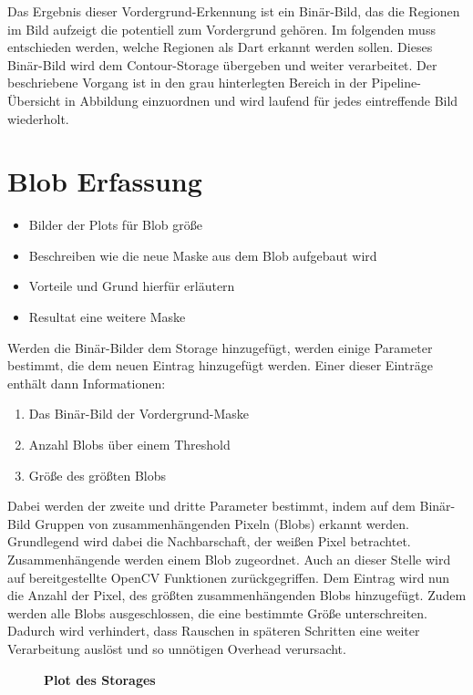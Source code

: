 Das Ergebnis dieser Vordergrund-Erkennung ist ein Binär-Bild, das die Regionen im Bild aufzeigt die potentiell zum Vordergrund gehören. Im folgenden muss entschieden werden, welche Regionen als Dart erkannt werden sollen. Dieses Binär-Bild wird dem Contour-Storage übergeben und weiter verarbeitet. Der beschriebene Vorgang ist in den grau hinterlegten Bereich in der Pipeline-Übersicht in Abbildung einzuordnen und wird laufend für jedes eintreffende Bild wiederholt.



\section{Blob Erfassung}
\label{sec:blob}

\begin{itemize}
\item Bilder der Plots für Blob größe
\item Beschreiben wie die neue Maske aus dem Blob aufgebaut wird
\item Vorteile und Grund hierfür erläutern
\item Resultat eine weitere Maske 
\end{itemize}

Werden die Binär-Bilder dem Storage hinzugefügt, werden einige Parameter bestimmt, die dem neuen Eintrag hinzugefügt werden.
Einer dieser Einträge enthält dann Informationen:
\begin{enumerate}
	\item Das Binär-Bild der Vordergrund-Maske
	\item Anzahl Blobs über einem Threshold
	\item Größe des größten Blobs
\end{enumerate}
Dabei werden der zweite und dritte Parameter bestimmt, indem auf dem Binär-Bild Gruppen von zusammenhängenden Pixeln (Blobs) erkannt werden. 
Grundlegend wird dabei die Nachbarschaft, der weißen Pixel betrachtet. Zusammenhängende werden einem Blob zugeordnet. Auch an dieser Stelle wird auf bereitgestellte OpenCV Funktionen zurückgegriffen. Dem Eintrag wird nun die Anzahl der Pixel, des größten zusammenhängenden Blobs hinzugefügt. Zudem werden alle Blobs ausgeschlossen, die eine bestimmte Größe unterschreiten. Dadurch wird verhindert, dass Rauschen in späteren Schritten eine weiter Verarbeitung auslöst und so unnötigen Overhead verursacht.
\begin{figure}[ht]
\centering
{}\qquad
\caption{\textbf{Plot des Storages}}
\label{Fig:blobplot}
\end{figure}

